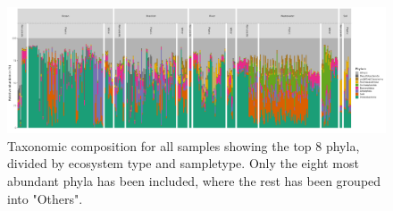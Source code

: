 \begin{figure}[h]
    \centering
    \includegraphics[width = 0.9\textheight, angle = 90]{figure/tax_phylum_ecosystem_sampletype.png}
    \caption{Taxonomic composition for all samples showing the top 8 phyla, divided by ecosystem type and sampletype. Only the eight most abundant phyla has been included, where the rest has been grouped into "Others".}
    \label{tax_plot}
\end{figure}












